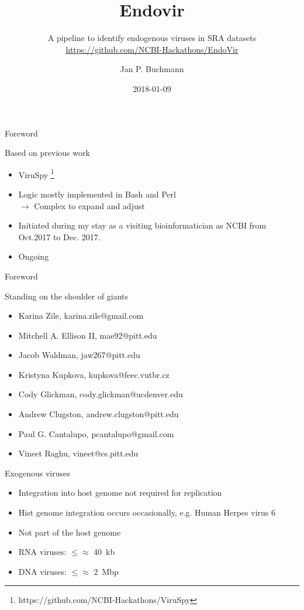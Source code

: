\documentclass{beamer}
\title[]{Endovir}
\subtitle{A pipeline to identify endogenous viruses in SRA datasets\\[1em]
          \small{\url{https://github.com/NCBI-Hackathons/EndoVir}}}
\author[]{Jan P. Buchmann}
\institute{NCBI, NLM, NIH, Bethesda, MD, USA \\
           The University of Sydney, Sydney, Australia}
\date{2018-01-09}
\begin{document}
  \titlepage

  \begin{frame}{Foreword}
    \begin{block}{Based on previous work}
      \begin{itemize}
        \item ViruSpy \footnote{https://github.com/NCBI-Hackathons/ViruSpy}
        \item Logic  mostly implemented in Bash and Perl \\
              $\rightarrow$ Complex to expand and adjust
        \item Initiated during my stay as a visiting bioinformatician as NCBI
              from Oct.2017 to Dec. 2017.
        \item Ongoing
      \end{itemize}
    \end{block}
  \end{frame}



  \begin{frame}{Foreword}
    \begin{block}{Standing on the shoulder of giants}
      \begin{itemize}
        \item Karina Zile, karina.zile@gmail.com
        \item Mitchell A. Ellison II, mae92@pitt.edu
        \item Jacob Waldman, jaw267@pitt.edu
        \item Kristyna Kupkova, kupkova@feec.vutbr.cz
        \item Cody Glickman, cody.glickman@ucdenver.edu
        \item Andrew Clugston, andrew.clugston@pitt.edu
        \item Paul G. Cantalupo, pcantalupo@gmail.com
        \item Vineet Raghu, vineet@cs.pitt.edu
      \end{itemize}
    \end{block}
  \end{frame}

  \begin{frame}{Exogenous viruses}
    \begin{itemize}
      \item Integration into host genome not required for replication
      \item Hist genome integration occurs occasionally, e.g. Human Herpes virus 6
      \item Not part of the host genome
      \item RNA viruses: $\le \approx$ 40~kb
      \item DNA viruses: $\le \approx$ 2~Mbp
    \end{itemize}
    \center
    
  \end{frame}
\end{document}
